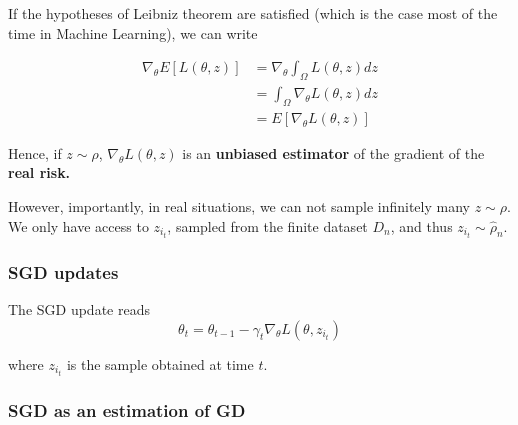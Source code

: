 \documentclass[
10pt, %
a4paper, %
oneside, %
headinclude,footinclude, %
BCOR5mm, %
]{scrartcl}
\begin{document}
% 
% 
% 
% 
If the hypotheses of Leibniz theorem are satisfied (which is the case most of the time in Machine Learning), we can write

\begin{equation*}
    \begin{aligned}
	\nabla_{\theta}E[L(\theta, z)]&= \nabla_{\theta} \int_{\Omega} L(\theta, z) dz\\
	&= \int_{\Omega} \nabla_{\theta}L(\theta, z) dz\\
	&= E[\nabla_{\theta}L(\theta, z)]
    \end{aligned}
\end{equation*}

Hence, if $z\sim \rho$, $\nabla_{\theta}L(\theta, z)$ is an \textbf{{unbiased estimator}} of the gradient of the \textbf{{real risk.}} 

However, importantly, in real situations, we can not sample infinitely many $z\sim \rho$. We only have access to $z_{i_t}$, sampled from the finite dataset $D_n$, and thus $z_{i_t}\sim \hat{\rho}_n$.

\subsubsection{\large\color{Periwinkle}SGD updates}

The SGD update reads
\begin{equation*}
    \theta_t = \theta_{t-1}-\gamma_t \nabla_{\theta} L(\theta, z_{i_t})
\end{equation*}

where $z_{i_t}$ is the sample obtained at time $t$.

\subsubsection{\large\color{Periwinkle}SGD as an estimation of GD}
\end{document}
